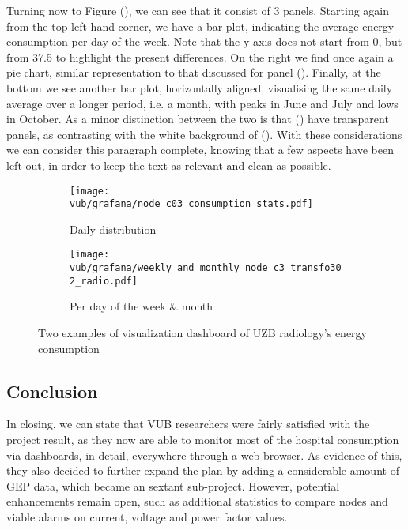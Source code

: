 Turning now to Figure (), we can see that it consist of 3 panels. Starting again from the top left-hand corner, 
we have a bar plot, indicating the average energy consumption per day of the week. %
Note that the y-axis does not start from 0, but from 37.5 to highlight the present differences. 
On the right we find once again a pie chart, similar representation to that discussed for panel ().
Finally, at the bottom we see another bar plot, horizontally aligned, visualising the same daily average over a longer period, i.e. a month, with peaks in June and July and lows in October. 
As a minor distinction between the two is that () have transparent panels, as contrasting with the white background of (). 
With these considerations we can consider this paragraph complete, knowing that a few aspects have been left out, in order to keep the text as relevant and clean as possible.

\begin{figure}
    \begin{subfigure}{\textwidth}
        \texttt{[image: vub/grafana/node\_c03\_consumption\_stats.pdf]}
        \caption{Daily distribution}
        \label{fig:vub_stats_v1}
    \end{subfigure}
    \begin{subfigure}{\textwidth}
        \texttt{[image: vub/grafana/weekly\_and\_monthly\_node\_c3\_transfo302\_radio.pdf]}
        \caption{Per day of the week \& month}
        \label{fig:vub_stats_v2}
    \end{subfigure}
    \caption{Two examples of visualization dashboard of \ac{UZB} radiology's energy consumption}
    \label{fig:vub_2_dashboard}
\end{figure}

\subsection{Conclusion}
In closing, we can state that \ac{VUB} researchers were fairly satisfied with the project result, as they now are able to monitor most of the hospital consumption via dashboards, in detail, everywhere through a web browser.
As evidence of this, they also decided to further expand the plan by adding a considerable amount of \ac{GEP} data, which became an sextant sub-project.
However, potential enhancements remain open, such as additional statistics to compare nodes and viable alarms on current, voltage and power factor values. 


